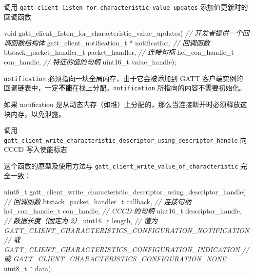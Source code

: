 \documentclass[
  12pt,
]{book}
\makeatletter
\newenvironment{Shaded}{\begin{snugshade}}{\end{snugshade}}
\newcommand{\CommentTok}[1]{\textcolor[rgb]{0.56,0.35,0.01}{\textit{#1}}}
\newcommand{\DataTypeTok}[1]{\textcolor[rgb]{0.13,0.29,0.53}{#1}}
\newcommand{\NormalTok}[1]{#1}
\newenvironment{kframe}{%
\medskip{}
\setlength{\fboxsep}{.8em}
 \def\at@end@of@kframe{}%
 \ifinner\ifhmode%
  \def\at@end@of@kframe{\end{minipage}}%
  \begin{minipage}{\columnwidth}%
 \fi\fi%
 \def\FrameCommand##1{\hskip\@totalleftmargin \hskip-\fboxsep
 \colorbox{shadecolor}{##1}\hskip-\fboxsep
     \hskip-\linewidth \hskip-\@totalleftmargin \hskip\columnwidth}%
 \MakeFramed {\advance\hsize-\width
   \@totalleftmargin\z@ \linewidth\hsize
   \@setminipage}}%
 {\par\unskip\endMakeFramed%
 \at@end@of@kframe}
\newenvironment{rmdblock}[1]
  {
  \begin{itemize}
  \renewcommand{\labelitemi}{
    \raisebox{-.7\height}[0pt][0pt]{
      {\setkeys{Gin}{width=3em,keepaspectratio}\texttt{[image: images/\#1]}}
    }
  }
  \setlength{\fboxsep}{1em}
  \begin{kframe}
  \item
  }
  {
  \end{kframe}
  \end{itemize}
  }
\newenvironment{rmdcaution}
  {\begin{rmdblock}{caution}}
  {\end{rmdblock}}
\makeatother
\begin{document}
\begin{enumerate}
\def\labelenumi{\arabic{enumi}.}
\item
  调用 \texttt{gatt\_client\_listen\_for\_characteristic\_value\_updates} 添加值更新时的回调函数

\begin{Shaded}
\begin{Highlighting}[]
\DataTypeTok{void}\NormalTok{ gatt_client_listen_for_characteristic_value_updates(}
    \CommentTok{// 开发者提供一个回调函数结构体}
\NormalTok{    gatt_client_notification_t * notification,}
    \CommentTok{// 回调函数}
\NormalTok{    btstack_packet_handler_t packet_handler,}
    \CommentTok{// 连接句柄}
\NormalTok{    hci_con_handle_t con_handle,}
    \CommentTok{// 特征的值的句柄}
    \DataTypeTok{uint16_t}\NormalTok{ value_handle);}
\end{Highlighting}
\end{Shaded}

  \texttt{notification} 必须指向一块全局内存，由于它会被添加到 GATT 客户端实例的回调链表中，一定\textbf{不能}在栈上分配。\texttt{notification} 所指向的内容不需要初始化。

  \begin{rmdcaution}
   如果 notification
   是从动态内存（如堆）上分配的，那么当连接断开时必须释放这块内存，以免泄露。
   \end{rmdcaution}
\item
  调用 \texttt{gatt\_client\_write\_characteristic\_descriptor\_using\_descriptor\_handle} 向 CCCD 写入使能标志

  这个函数的原型及使用方法与 \texttt{gatt\_client\_write\_value\_of\_characteristic} 完全一致：

\begin{Shaded}
\begin{Highlighting}[]
\DataTypeTok{uint8_t}\NormalTok{ gatt_client_write_characteristic_descriptor_using_descriptor_handle(}
    \CommentTok{// 回调函数}
\NormalTok{    btstack_packet_handler_t callback,}
    \CommentTok{// 连接句柄}
\NormalTok{    hci_con_handle_t con_handle,}
    \CommentTok{// CCCD 的句柄}
    \DataTypeTok{uint16_t}\NormalTok{ descriptor_handle,}
    \CommentTok{// 数据长度（固定为 2）}
    \DataTypeTok{uint16_t}\NormalTok{ length,}
    \CommentTok{// 值为 GATT_CLIENT_CHARACTERISTICS_CONFIGURATION_NOTIFICATION}
    \CommentTok{// 或   GATT_CLIENT_CHARACTERISTICS_CONFIGURATION_INDICATION}
    \CommentTok{// 或   GATT_CLIENT_CHARACTERISTICS_CONFIGURATION_NONE}
    \DataTypeTok{uint8_t}\NormalTok{  * data);}
\end{Highlighting}
\end{Shaded}
\end{enumerate}
\end{document}

